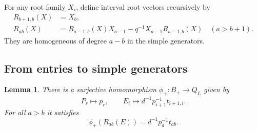 \documentclass[11pt]{article}
\newtheorem{lemma}[theorem]{Lemma}
\theoremstyle{definition}
\theoremstyle{remark}
\begin{document}
For any root family $X_i$, define interval root vectors recursively by
\begin{equation}\label{eq:root-vectors}
 \begin{aligned}
 R_{b+1,b}(X)&=X_b,\\
 R_{ab}(X)&=R_{a-1,b}(X)X_{a-1}-q^{-1}X_{a-1}R_{a-1,b}(X)\quad(a>b+1).
 \end{aligned}
\end{equation}
They are homogeneous of degree $a-b$ in the simple generators.

\subsection{From entries to simple generators}
\begin{lemma}\label{lem:matrix-to-borel}
There is a surjective homomorphism $\phi_+:B_+\to Q_L$ given by
\begin{equation}\label{eq:phi-positive}
 P_r\longmapsto p_r,\qquad
 E_i\longmapsto d^{-1}p_{i+1}^{-1}t_{i+1,i}.
\end{equation}
For all $a>b$ it satisfies
\begin{equation}\label{eq:root-image}
 \phi_+(R_{ab}(E))=d^{-1}p_a^{-1}t_{ab}.
\end{equation}
\end{lemma}
\end{document}
